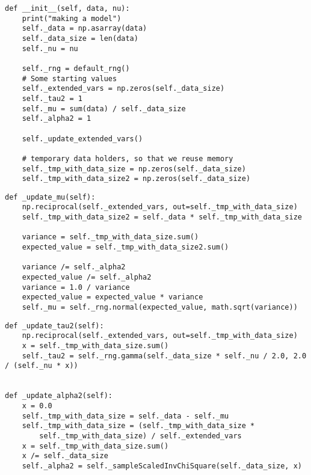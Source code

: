 \documentclass[8pt]{beamer}
\begin{document}
\begin{frame}[fragile]
\begin{verbatim}
def __init__(self, data, nu):
	print("making a model")
	self._data = np.asarray(data)
	self._data_size = len(data)
	self._nu = nu

	self._rng = default_rng()
	# Some starting values
	self._extended_vars = np.zeros(self._data_size)
	self._tau2 = 1
	self._mu = sum(data) / self._data_size
	self._alpha2 = 1

	self._update_extended_vars()
	
	# temporary data holders, so that we reuse memory
	self._tmp_with_data_size = np.zeros(self._data_size)
	self._tmp_with_data_size2 = np.zeros(self._data_size)
\end{verbatim}
\end{frame}

\begin{frame}[fragile]
\begin{verbatim}
def _update_mu(self):
	np.reciprocal(self._extended_vars, out=self._tmp_with_data_size)
	self._tmp_with_data_size2 = self._data * self._tmp_with_data_size

	variance = self._tmp_with_data_size.sum()
	expected_value = self._tmp_with_data_size2.sum()

	variance /= self._alpha2
	expected_value /= self._alpha2
	variance = 1.0 / variance
	expected_value = expected_value * variance
	self._mu = self._rng.normal(expected_value, math.sqrt(variance))
\end{verbatim}
\end{frame}

\begin{frame}[fragile]
\begin{verbatim}
def _update_tau2(self):
	np.reciprocal(self._extended_vars, out=self._tmp_with_data_size)
	x = self._tmp_with_data_size.sum()
	self._tau2 = self._rng.gamma(self._data_size * self._nu / 2.0, 2.0 / (self._nu * x))


def _update_alpha2(self):
	x = 0.0
	self._tmp_with_data_size = self._data - self._mu
	self._tmp_with_data_size = (self._tmp_with_data_size * 
		self._tmp_with_data_size) / self._extended_vars
	x = self._tmp_with_data_size.sum()
	x /= self._data_size
	self._alpha2 = self._sampleScaledInvChiSquare(self._data_size, x)
\end{verbatim}
\end{frame}
\end{document}

